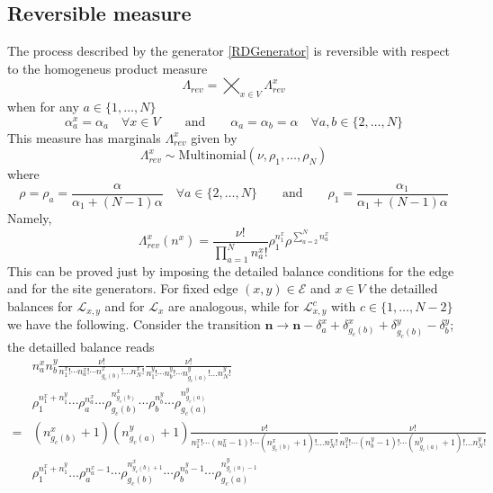 \documentclass[11pt]{article}
\numberwithin{equation}{section}
\numberwithin{equation}{subsection}
\newcommand{\twoj}{\nu}
\begin{document}
\subsection{Reversible measure} 
The process described by the generator \eqref{RDGenerator} is reversible with respect to the homogeneus product measure \begin{equation}\label{reversibleMeasureRD}
	\Lambda_{rev}=\bigtimes_{x\in V}\Lambda_{rev}^{x}
\end{equation}
when for any $a\in\{1,\ldots,N\}$
\begin{equation}\label{reversibilityConditionRD}
	\alpha_{a}^{x}=\alpha_{a}\quad \forall x\in V\qquad\text{and}\qquad \alpha_{a}=\alpha_{b}=\alpha \quad \forall a,b\in \{2,\ldots,N\}
\end{equation}
This measure has marginals $\Lambda_{rev}^{x}$ given by 
\begin{equation}
	\Lambda^{x}_{rev}\sim \text{Multinomial}\left(\twoj,\rho_{1},\ldots,\rho_{N}\right)
\end{equation}
where 
\begin{equation}
	\rho=\rho_{a}=\frac{\alpha}{\alpha_{1}+(N-1)\alpha}\quad \forall a\in \{2,\ldots,N\}\qquad \text{and}\qquad \rho_{1}=\frac{\alpha_{1}}{\alpha_{1}+(N-1)\alpha}
\end{equation}
Namely,
\begin{equation}
	\Lambda_{rev}^{x}(n^{x})=\frac{\nu!}{\prod_{a=1}^{N}n_{a}^{x}!}\rho_{1}^{n_{1}^{x}}\rho^{\sum_{a=2}^{N}n_{a}^{x}}
\end{equation}
This can be proved just by imposing the detailed balance conditions for the edge and for the site generators. For fixed edge $(x,y)\in \mathcal{E}$ and $x\in V$ the detailled balances for $\mathcal{L}_{x,y}$ and for $\mathcal{L}_{x}$ are analogous, while for $\mathcal{L}_{x,y}^{c}$ with $c\in\{1,\ldots,N-2\}$ we have the following. Consider the transition $\bm{n}\to \bm{n}-\delta_{a}^{x}+\delta_{g_{c}(b)}^{x}+\delta_{g_{c}(b)}^{y}-\delta_{b}^{y}$; the detailled balance reads
\begin{equation}
	\begin{split}
		&n_{a}^{x}n_{b}^{y}\frac{\nu!}{n_{1}^{x}!\cdots n_{a}^{x}!\cdots n_{g_{c}(b)}^{x}!\ldots n_{N}^{x}!}\frac{\nu!}{n_{1}^{y}!\cdots n_{b}^{y}!\cdots n_{g_{c}(a)}^{y}!\ldots n_{N}^{y}!}\\&\rho_{1}^{n_{1}^{x}+n_{1}^{y}}\cdots \rho_{a}^{n_{a}^{x}}\cdots\rho_{g_{c}(b)}^{n_{g_{c}(b)}^{x}}\cdots\rho_{b}^{n_{b}^{y}}\cdots \rho_{g_{c}(a)}^{n_{g_{c}(a)}^{y}}
		\\
		=&(n_{g_{c}(b)}^{x}+1)(n_{g_{c}(a)}^{y}+1)\frac{\nu!}{n_{1}^{x}!\cdots (n_{a}^{x}-1)!\cdots (n_{g_{c}(b)}^{x}+1)!\ldots n_{N}^{x}!}\frac{\nu!}{n_{1}^{y}!\cdots (n_{b}^{y}-1)!\cdots (n_{g_{c}(a)}^{y}+1)!\ldots n_{N}^{y}!}
		\\&
		\rho_{1}^{n_{1}^{x}+n_{1}^{y}}\ldots \rho_{a}^{n_{a}^{x}-1}\cdots\rho_{g_{c}(b)}^{n_{g_{c}(b)+1}^{x}}\cdots\rho_{b}^{n_{b}^{y}-1}\cdots \rho_{g_{c}(a)}^{n_{g_{c}(a)-1}^{y}}
	\end{split}
\end{equation}
\end{document}
